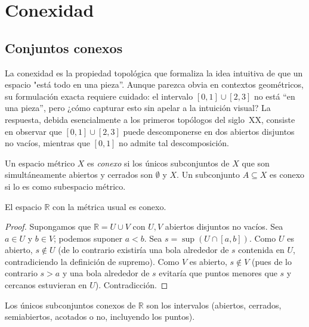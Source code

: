 \chapter{Conexidad}
\label{ch:conexidad}

\section{Conjuntos conexos}

La conexidad es la propiedad topológica que formaliza la idea intuitiva de que un espacio "está todo en una pieza''. Aunque parezca obvia en contextos geométricos, su formulación exacta requiere cuidado: el intervalo $[0,1]\cup[2,3]$ no está ``en una pieza'', pero ¿cómo capturar esto sin apelar a la intuición visual? La respuesta, debida esencialmente a los primeros topólogos del siglo~XX, consiste en observar que $[0,1]\cup[2,3]$ puede descomponerse en dos abiertos disjuntos no vacíos, mientras que $[0,1]$ no admite tal descomposición.

\begin{definition}
\label{def:conexo}
Un espacio métrico $X$ es \emph{conexo} si los únicos subconjuntos de $X$ que son simultáneamente abiertos y cerrados son $\emptyset$ y $X$. Un subconjunto $A\subseteq X$ es conexo si lo es como subespacio métrico.
\end{definition}

\begin{theorem}
\label{teo:r-conexo}
El espacio $\mathbb{R}$ con la métrica usual es conexo.
\end{theorem}
\begin{proof}
Supongamos que $\mathbb{R}=U\cup V$ con $U,V$ abiertos disjuntos no vacíos. Sea $a\in U$ y $b\in V$; podemos suponer $a<b$. Sea $s=\sup(U\cap[a,b])$. Como $U$ es abierto, $s\notin U$ (de lo contrario existiría una bola alrededor de $s$ contenida en $U$, contradiciendo la definición de supremo). Como $V$ es abierto, $s\notin V$ (pues de lo contrario $s>a$ y una bola alrededor de $s$ evitaría que puntos menores que $s$ y cercanos estuvieran en $U$). Contradicción.
\end{proof}

\begin{theorem}
\label{teo:intervalos-conexos}
Los únicos subconjuntos conexos de $\mathbb{R}$ son los intervalos (abiertos, cerrados, semiabiertos, acotados o no, incluyendo los puntos).
\end{theorem}

